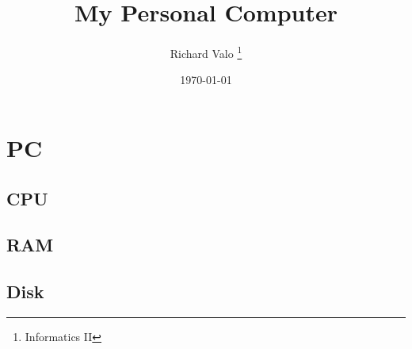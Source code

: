\documentclass[12pt, letterpaper, twoside]{report}
\title{My Personal Computer}
\author{Richard Valo \thanks{Informatics II}}
\date{\today}
\begin{document}
\maketitle
\chapter{PC}
\section{CPU}
\section{RAM}
\section{Disk}


\end{document}
